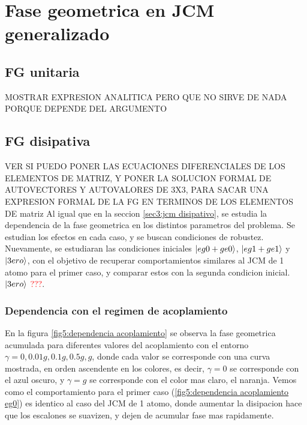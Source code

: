 \chapter{Fase geometrica en JCM generalizado}
\label{ch5:fgdoble}

\pagestyle{fancy}
\fancyhf{}
\fancyhead[LE]{\nouppercase{\rightmark\hfill}}
\fancyhead[RO]{\nouppercase{\leftmark\hfill}}
\fancyfoot[LE,RO]{\hfill\thepage\hfill}

\section{FG unitaria}
MOSTRAR EXPRESION ANALITICA PERO QUE NO SIRVE DE NADA PORQUE DEPENDE DEL ARGUMENTO
\section{FG disipativa}
VER SI PUEDO PONER LAS ECUACIONES DIFERENCIALES DE LOS ELEMENTOS DE MATRIZ, Y PONER LA SOLUCION FORMAL DE AUTOVECTORES Y AUTOVALORES DE 3X3, PARA SACAR UNA EXPRESION FORMAL DE LA FG EN TERMINOS DE LOS ELEMENTOS DE matriz
Al igual que en la seccion \ref{sec3:jcm disipativo}, se estudia la dependencia de la fase geometrica en los distintos parametros del problema. Se estudian los efectos en cada caso, y se buscan condiciones de robustez. Nuevamente, se estudiaran las condiciones iniciales $\ket{eg0+ge0}$, $\ket{eg1+ge1}$ y $\ket{3ero}$, con el objetivo de recuperar comportamientos similares al JCM de 1 atomo para el primer caso, y comparar estos con la segunda condicion inicial. \textcolor{red}{$\ket{3ero}$ ???}.
\subsection{Dependencia con el regimen de acoplamiento}
En la figura \ref{fig5:dependencia acoplamiento} se observa la fase geometrica acumulada para diferentes valores del acoplamiento con el entorno $\gamma=0, 0.01g,0.1g,0.5g,g$, donde cada valor se corresponde con una curva mostrada, en orden ascendente en los colores, es decir, $\gamma=0$ se corresponde con el azul oscuro, y $\gamma=g$ se corresponde con el color mas claro, el naranja. Vemos como el comportamiento para el primer caso (\ref{fig5:dependencia acoplamiento eg0}) es identico al caso del JCM de 1 atomo, donde aumentar la disipacion hace que los escalones se suavizen, y dejen de acumular fase mas rapidamente. 

